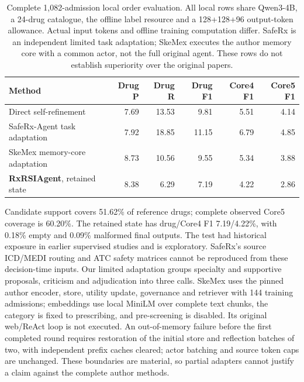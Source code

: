 \begin{table}[t]\centering\small
\setlength{\tabcolsep}{4pt}
\caption{Complete 1,082-admission local order evaluation. All local rows share Qwen3-4B, a 24-drug catalogue, the offline label resource and a 128+128+96 output-token allowance. Actual input tokens and offline training computation differ. SafeRx is an independent limited task adaptation; SkeMex executes the author memory core with a common actor, not the full original agent. These rows do not establish superiority over the original papers.}
\label{tab:local-orders}
\begin{tabular}{@{}p{5.4cm}rrrrr@{}}\toprule
Method & Drug P & Drug R & Drug F1 & Core4 F1 & Core5 F1\\\midrule
Direct self-refinement & 7.69 & 13.53 & 9.81 & 5.51 & 4.14\\
SafeRx-Agent task adaptation \citep{saferx} & 7.92 & 18.85 & 11.15 & 6.79 & 4.85\\
SkeMex memory-core adaptation \citep{skemex} & 8.73 & 10.56 & 9.55 & 5.34 & 3.88\\
\textbf{RxRSIAgent}, retained state & 8.38 & 6.29 & 7.19 & 4.22 & 2.86\\
\bottomrule\end{tabular}
\end{table}Candidate support covers 51.62\% of reference drugs; complete observed Core5 coverage is 60.20\%. The retained state has drug/Core4 F1 7.19/4.22\%, with 0.18\% empty and 0.09\% malformed final outputs. The test had historical exposure in earlier supervised studies and is exploratory.
SafeRx's source ICD/MEDI routing and ATC safety matrices cannot be reproduced from these decision-time inputs. Our limited adaptation groups specialty and supportive proposals, criticism and adjudication into three calls. SkeMex uses the pinned author encoder, store, utility update, governance and retriever with 144 training admissions; embeddings use local MiniLM over complete text chunks, the category is fixed to prescribing, and pre-screening is disabled. Its original web/ReAct loop is not executed. An out-of-memory failure before the first completed round requires restoration of the initial store and reflection batches of two, with independent prefix caches cleared; actor batching and source token caps are unchanged. These boundaries are material, so partial adapters cannot justify a claim against the complete author methods.

